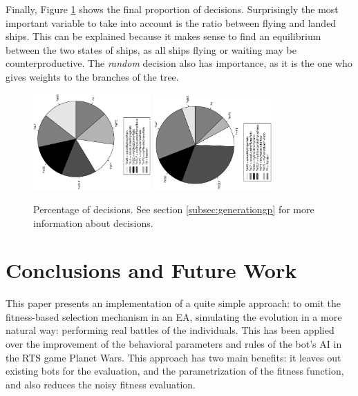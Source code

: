 \documentclass[conference]{IEEEtran}
\begin{document}
Finally, Figure \ref{figura:tarta_decissions} shows the final proportion of decisions. Surprisingly the most important variable to take into account is the ratio between flying and landed ships. This can be explained because it makes sense to find an equilibrium between the two states of ships, as all ships flying or waiting may be counterproductive. The {\em random} decision also has importance, as it is the one who gives weights to the branches of the tree.
\begin{figure}[htb]
\tiny
\begin{center}


    \includegraphics[trim=1cm 5.5cm 0cm 5.5cm, clip=true,width=4.5cm,angle=-90]{./imags/distribution_initial_condition.eps}
    \includegraphics[trim=1cm 5.5cm 0cm 5.5cm, clip=true,width=4.5cm,angle=-90]{./imags/distribution_final_condition.eps}



\end{center}
\caption{Percentage of decisions. See section \ref{subsec:generationgp} for more information about decisions.}
\label{figura:tarta_decissions}
\end{figure}




%
\section{Conclusions and Future Work}
\label{sec:conclusions}

This paper presents an implementation of a quite simple approach: to omit the fitness-based selection mechanism in an EA, simulating the evolution in a more natural way: performing real battles of the individuals. This has been applied over the improvement of the behavioral parameters and rules of the bot's AI in the RTS game Planet Wars. This approach has two main benefits: it leaves out existing bots for the evaluation, and the parametrization of the fitness function, and also reduces the noisy fitness evaluation.
\end{document}
